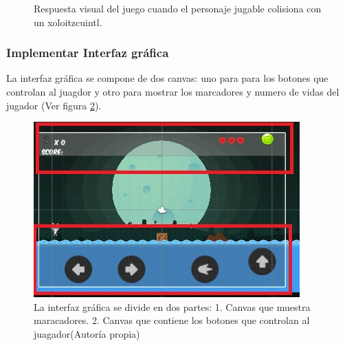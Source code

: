 \begin{figure}
  \centering
  
   

  \caption{Respuesta visual del juego cuando el personaje jugable colisiona con un xoloitzcuintl.}
  \label{figPersonajeResXo}
\end{figure} 

\subsubsection{Implementar Interfaz gráfica} 
La interfaz gráfica se compone de dos canvas: uno para para los botones que 
controlan al juagdor y otro para mostrar los marcadores y numero de vidas del 
jugador (Ver figura \ref{figCanvas}).
\\
 \par
\begin{figure}
  \centering
   \includegraphics[width=0.4 \textwidth]{05TrabajoRealizado/03Unity/imagenes/02ConfiguracionCanvas02}
  \caption{La interfaz gráfica se divide en dos partes: 1. Canvas que muestra maracadores. 2. Canvas que contiene los botones que controlan al juagador(Autoría propia)}
  \label{figCanvas}
\end{figure} 

